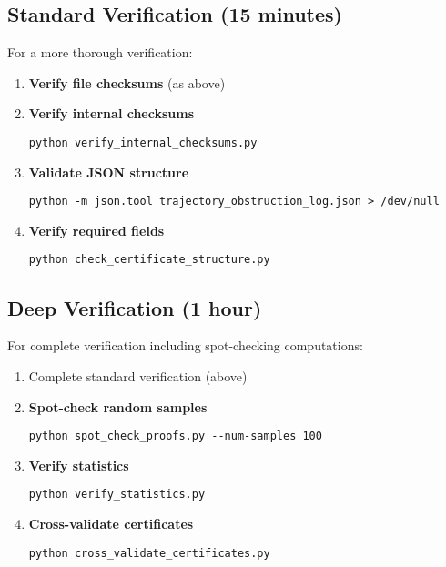 \documentclass[11pt,a4paper]{article}
\theoremstyle{definition}
\begin{document}
\subsection{Standard Verification (15 minutes)}

For a more thorough verification:

\begin{enumerate}
    \item \textbf{Verify file checksums} (as above)
    
    \item \textbf{Verify internal checksums}
    \begin{lstlisting}[style=pythonstyle]
python verify_internal_checksums.py
    \end{lstlisting}
    
    \item \textbf{Validate JSON structure}
    \begin{lstlisting}[style=pythonstyle]
python -m json.tool trajectory_obstruction_log.json > /dev/null
    \end{lstlisting}
    
    \item \textbf{Verify required fields}
    \begin{lstlisting}[style=pythonstyle]
python check_certificate_structure.py
    \end{lstlisting}
\end{enumerate}

\subsection{Deep Verification (1 hour)}

For complete verification including spot-checking computations:

\begin{enumerate}
    \item Complete standard verification (above)
    
    \item \textbf{Spot-check random samples}
    \begin{lstlisting}[style=pythonstyle]
python spot_check_proofs.py --num-samples 100
    \end{lstlisting}
    
    \item \textbf{Verify statistics}
    \begin{lstlisting}[style=pythonstyle]
python verify_statistics.py
    \end{lstlisting}
    
    \item \textbf{Cross-validate certificates}
    \begin{lstlisting}[style=pythonstyle]
python cross_validate_certificates.py
    \end{lstlisting}
\end{enumerate}
\end{document}
